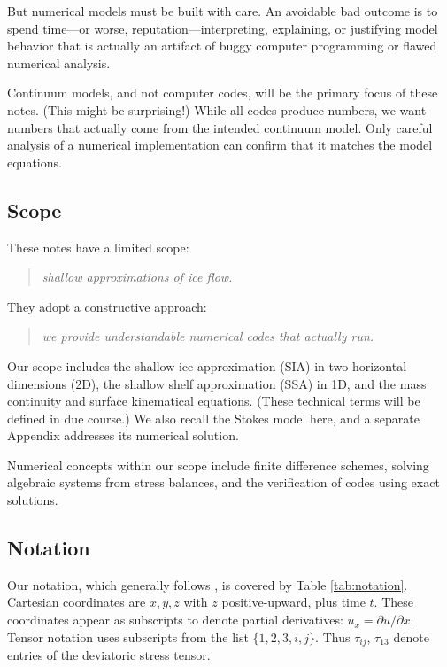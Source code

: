 \documentclass[letterpaper,final,12pt,reqno]{amsart}
\begin{document}
But numerical models must be built with care.  An avoidable bad outcome is to spend time---or worse, reputation---interpreting, explaining, or justifying model behavior that is actually an artifact of buggy computer programming or flawed numerical analysis.

Continuum models, and not computer codes, will be the primary focus of these notes.  (This might be surprising!)  While all codes produce numbers, we want numbers that actually come from the intended continuum model.  Only careful analysis of a numerical implementation can confirm that it matches the model equations.

\subsection*{Scope}  These notes have a limited scope:
  \begin{quote}\emph{shallow approximations of ice flow.}\end{quote}
They adopt a constructive approach:
  \begin{quote}\emph{we provide understandable numerical codes that actually run.}\end{quote}

Our scope includes the shallow ice approximation (SIA) in two horizontal dimensions (2D), the shallow shelf approximation (SSA) in 1D, and the mass continuity and surface kinematical equations.  (These technical terms will be defined in due course.)  We also recall the Stokes model here, and a separate Appendix addresses its numerical solution.

Numerical concepts within our scope include finite difference schemes, solving algebraic systems from stress balances, and the verification of codes using exact solutions.

\subsection*{Notation}  Our notation, which generally follows \cite{GreveBlatter2009}, is covered by Table \ref{tab:notation}.  Cartesian coordinates are $x,y,z$ with $z$ positive-upward, plus time $t$.  These coordinates appear as subscripts to denote partial derivatives: $u_x = \partial u/\partial x$.  Tensor notation uses subscripts from the list $\{1,2,3,i,j\}$.  Thus $\tau_{ij}$, $\tau_{13}$ denote entries of the deviatoric stress tensor.
\end{document}
